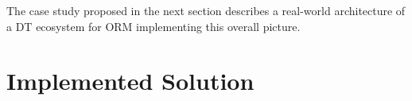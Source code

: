 
The case study proposed in the next section describes a real-world architecture of a DT ecosystem for ORM implementing this overall picture.



\section{Implemented Solution}
